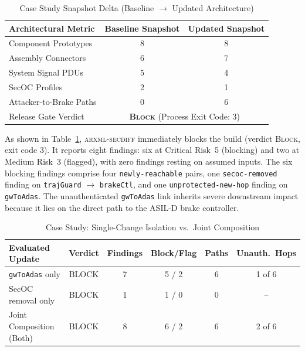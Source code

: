\documentclass[journal]{IEEEtran}
\begin{document}
\begin{table}[t]
\centering
\caption{Case Study Snapshot Delta (Baseline $\to$ Updated Architecture)}
\label{tab:delta}
\renewcommand{\arraystretch}{1.15}
\begin{tabular}{@{}lcc@{}}
\toprule
\textbf{Architectural Metric} & \textbf{Baseline Snapshot} & \textbf{Updated Snapshot} \\
\midrule
Component Prototypes & 8 & 8 \\
Assembly Connectors  & 6 & 7 \\
System Signal PDUs   & 5 & 4 \\
SecOC Profiles       & 2 & 1 \\
Attacker-to-Brake Paths & 0 & 6 \\
\midrule
Release Gate Verdict & \multicolumn{2}{c}{\textbf{\textsc{Block}} (Process Exit Code: 3)} \\
\bottomrule
\end{tabular}
\end{table}

As shown in Table~\ref{tab:delta}, \textsc{arxml-secdiff} immediately blocks the build (verdict \textsc{Block}, exit code 3). It reports eight findings: six at Critical Risk~5 (blocking) and two at Medium Risk~3 (flagged), with zero findings resting on assumed inputs. The six blocking findings comprise four \texttt{newly-reachable} pairs, one \texttt{secoc-removed} finding on \texttt{trajGuard} $\to$ \texttt{brakeCtl}, and one \texttt{unprotected-new-hop} finding on \texttt{gwToAdas}. The unauthenticated \texttt{gwToAdas} link inherits severe downstream impact because it lies on the direct path to the ASIL-D brake controller.

\begin{table}[t]
\centering
\caption{Case Study: Single-Change Isolation vs.\ Joint Composition}
\label{tab:single}
\renewcommand{\arraystretch}{1.15}
\footnotesize
\setlength{\tabcolsep}{3pt}
\begin{tabular}{@{}lccccc@{}}
\toprule
\textbf{Evaluated Update} & \textbf{Verdict} & \textbf{Findings} & \textbf{Block/Flag} & \textbf{Paths} & \textbf{Unauth.\ Hops} \\
\midrule
\texttt{gwToAdas} only    & BLOCK & 7 & 5 / 2 & 6 & 1 of 6 \\
SecOC removal only        & BLOCK & 1 & 1 / 0 & 0 & -- \\
Joint Composition (Both)  & BLOCK & 8 & 6 / 2 & 6 & 2 of 6 \\
\bottomrule
\end{tabular}
\end{table}
\end{document}
